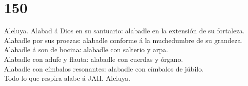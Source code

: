 \hypertarget{section-149}{%
\section{150}\label{section-149}}

 Aleluya. Alabad á Dios en su santuario: alabadle en la
extensión de su fortaleza.\\
 Alabadle por sus proezas: alabadle conforme á la
muchedumbre de su grandeza.\\
 Alabadle á son de bocina: alabadle con salterio y arpa.\\
 Alabadle con adufe y flauta: alabadle con cuerdas y
órgano.\\
 Alabadle con címbalos resonantes: alabadle con címbalos de
júbilo.\\
 Todo lo que respira alabe á JAH. Aleluya.
